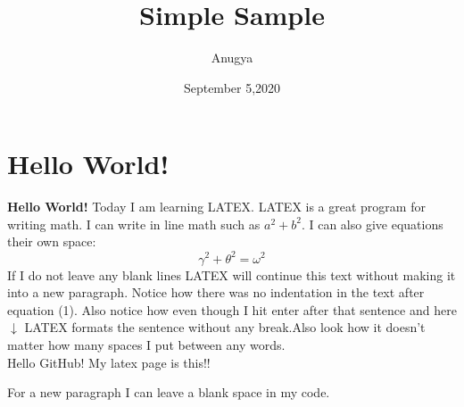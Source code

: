 \documentclass[10 pt]{article}
\begin{document}
\title{Simple Sample}
\author{Anugya}
\date{September 5,2020}
\maketitle
\section{Hello World!}
\textbf{Hello World!}
Today I am learning {\Large L}A{\Large T}E{\Large X}. LATEX is a great program for writing math. I can write in line math such as $a^2+b^2$. I can also give equations their own space:
\begin{equation}
\gamma^2+\theta^2=\omega^2
\end{equation}
If I do not leave any blank lines LATEX will continue this text without making it into a new paragraph. Notice how there was no indentation in the text after equation (1). Also notice how even though I hit enter after that sentence and here $\downarrow$ LATEX formats the sentence without any break.Also look how it doesn't
matter how many spaces I put between any words. \\ 
Hello GitHub! My latex page is this!!

For a new paragraph I can leave a blank space in my code.
\end{document}
